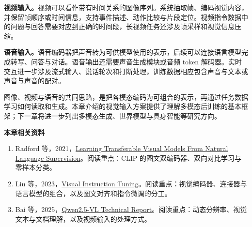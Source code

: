 \textbf{视频输入。}视频可以看作带有时间关系的图像序列。系统抽取帧、编码视觉内容，并保留帧顺序或时间信息，支持事件描述、动作比较与片段定位。视频指令数据中的问题与回答需要对应到正确的时间段，长视频任务还涉及帧采样和视觉信息压缩。

\textbf{语音输入。}语音编码器把声音转为可供模型使用的表示，后续可以连接语言模型完成转写、问答与对话。语音输出还需要声音生成模块或音频 token 解码器。实时交互进一步涉及流式输入、说话轮次和打断处理，训练数据相应包含声音与文本或声音与声音的配对。

图像、视频与语音的共同思路，是把各模态编码为可组合的表示，再通过任务数据学习如何读取和生成。本章介绍的视觉输入方案提供了理解多模态后训练的基本框架；下一章将进一步列出多模态生成、世界模型与具身智能等研究方向。

\textbf{本章相关资料}
\begin{enumerate}
    \item Radford 等，2021，\href{https://arxiv.org/abs/2103.00020}{Learning Transferable Visual Models From Natural Language Supervision}。阅读重点：CLIP 的图文双编码器、双向对比学习与零样本分类。
    \item Liu 等，2023，\href{https://arxiv.org/abs/2304.08485}{Visual Instruction Tuning}。阅读重点：视觉编码器、连接器与语言模型的组合，以及图文对齐和指令微调的分工。
    \item Bai 等，2025，\href{https://arxiv.org/abs/2502.13923}{Qwen2.5-VL Technical Report}。阅读重点：动态分辨率、视觉文本与文档理解，以及视频输入的处理方式。
\end{enumerate}
